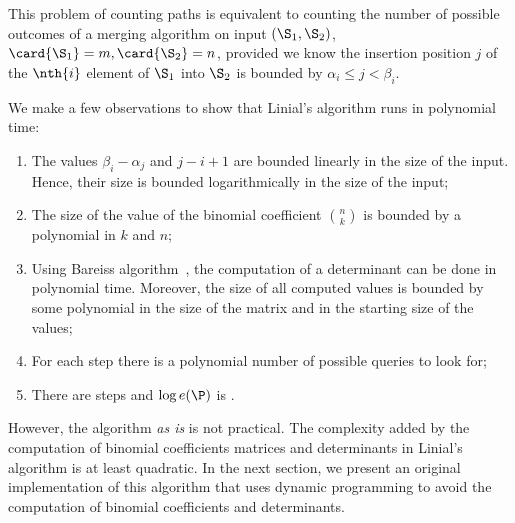 This problem of counting paths is equivalent to counting the number of possible
outcomes of a merging algorithm on input \((\S_1,\S_2)\), \(\card{\S_1} = m,
\card{\S_2} = n\), provided we know the insertion position \(j\) of the
\(\nth{i}\) element of \(\S_1\) into \(\S_2\) is bounded by \(\alpha_i \le j <
\beta_i\).

We make a few observations to show that Linial's algorithm runs in
polynomial time:
\begin{enumerate}
\item The values \(\beta_i - \alpha_j\) and \(j - i + 1\) are bounded
linearly in the size of the input. Hence, their size is bounded
logarithmically in the size of the input;
\item The size of the value of the binomial coefficient \(\binom{n}{k}\) is
bounded by a polynomial in \(k\) and \(n\);
\item Using Bareiss algorithm~\cite{bareiss:1968}, the computation of a
determinant can be done in polynomial time. Moreover, the size of all computed
values is bounded by some polynomial in the size of the matrix and in the starting
size of the values;
\item For each step there is a polynomial number of possible queries to look for;
\item There are  steps and \(\log e(\P)\) is .
\end{enumerate}

However, the algorithm \emph{as is} is not practical. The complexity added
by the computation of binomial coefficients matrices and determinants in
Linial's algorithm is at least quadratic. In the next section, we present an
original implementation of this algorithm that uses dynamic programming to
avoid the computation of binomial coefficients and determinants.
